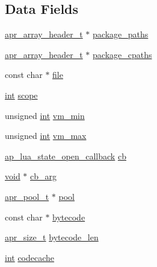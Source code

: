 \subsection*{Data Fields}
\begin{DoxyCompactItemize}
\item 
\hyperlink{structapr__array__header__t}{apr\+\_\+array\+\_\+header\+\_\+t} $\ast$ \hyperlink{structap__lua__vm__spec_a067b46ce0502fb803c6a45e7da635da2}{package\+\_\+paths}
\item 
\hyperlink{structapr__array__header__t}{apr\+\_\+array\+\_\+header\+\_\+t} $\ast$ \hyperlink{structap__lua__vm__spec_a83921842aa666c9355f7d98ac757a7e6}{package\+\_\+cpaths}
\item 
const char $\ast$ \hyperlink{structap__lua__vm__spec_aff6a944e039ad2b6bab3536c612a1753}{file}
\item 
\hyperlink{pcre_8txt_a42dfa4ff673c82d8efe7144098fbc198}{int} \hyperlink{structap__lua__vm__spec_a3f48f62745598fabcf1715977f6e8d77}{scope}
\item 
unsigned \hyperlink{pcre_8txt_a42dfa4ff673c82d8efe7144098fbc198}{int} \hyperlink{structap__lua__vm__spec_aa7a5fba22158814ea6771904bf5db7ce}{vm\+\_\+min}
\item 
unsigned \hyperlink{pcre_8txt_a42dfa4ff673c82d8efe7144098fbc198}{int} \hyperlink{structap__lua__vm__spec_a0a68e82b1a4d6d6917fa2f7be29fb27e}{vm\+\_\+max}
\item 
\hyperlink{lua__vmprep_8h_abc818265649f07beed1818e94833db16}{ap\+\_\+lua\+\_\+state\+\_\+open\+\_\+callback} \hyperlink{structap__lua__vm__spec_ad7857626400caadfc375acb99b1f6031}{cb}
\item 
\hyperlink{group__MOD__ISAPI_gacd6cdbf73df3d9eed42fa493d9b621a6}{void} $\ast$ \hyperlink{structap__lua__vm__spec_a0fb39f5f1c500efc08c78433af546af4}{cb\+\_\+arg}
\item 
\hyperlink{structapr__pool__t}{apr\+\_\+pool\+\_\+t} $\ast$ \hyperlink{structap__lua__vm__spec_a814452a7ae9ad93e886d0a062e3ae41e}{pool}
\item 
const char $\ast$ \hyperlink{structap__lua__vm__spec_a3fee13bec9ac75a95f7bbd75e5ad197a}{bytecode}
\item 
\hyperlink{group__apr__platform_gaaa72b2253f6f3032cefea5712a27540e}{apr\+\_\+size\+\_\+t} \hyperlink{structap__lua__vm__spec_abe73bf8917b08b2d8df6f8e1db71df1b}{bytecode\+\_\+len}
\item 
\hyperlink{pcre_8txt_a42dfa4ff673c82d8efe7144098fbc198}{int} \hyperlink{structap__lua__vm__spec_a75c203f3dc753fa4d50c51d24f84c0f7}{codecache}
\end{DoxyCompactItemize}


